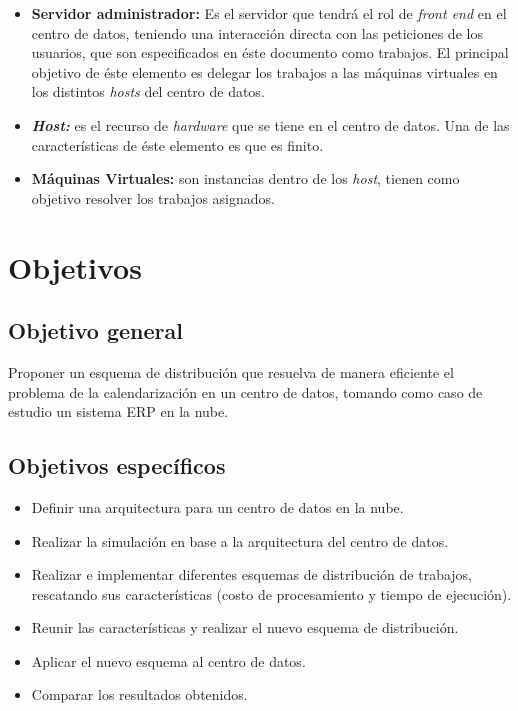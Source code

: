 \begin{itemize}
	\item \textbf{Servidor administrador:} Es el servidor que tendr\'a el rol de \textit{front end} en el centro de datos, teniendo una interacci\'on directa con las peticiones de los usuarios, que son especificados en \'este documento como trabajos.
	El principal objetivo de \'este elemento es delegar los trabajos a las m\'aquinas virtuales en los distintos \textit{hosts} del centro de datos.
	\item \textit{\textbf{Host:}} es el recurso de \textit{hardware} que se tiene en el centro de datos. Una de las caracter\'isticas de \'este elemento es que es finito.
	\item \textbf{M\'aquinas Virtuales:} son instancias dentro de los \textit{host}, tienen como objetivo resolver los trabajos asignados.
\end{itemize}


\newpage

\section*{Objetivos}


\subsection*{Objetivo general}



Proponer un esquema de distribución que resuelva de manera eficiente el problema de la calendarización en un centro de datos, tomando como caso de estudio un sistema ERP en la nube.


\subsection*{Objetivos espec\'ificos}



\begin{itemize}
	\item Definir una arquitectura para un centro de datos en la nube.
	\item Realizar la simulación en base a la arquitectura del centro de datos.
	\item Realizar e implementar diferentes esquemas de distribución de trabajos, rescatando sus características (costo de procesamiento y tiempo de ejecución).
	\item Reunir las características y realizar el nuevo esquema de distribución.
	\item Aplicar el nuevo esquema al centro de datos.
	\item Comparar los resultados obtenidos.
\end{itemize}


